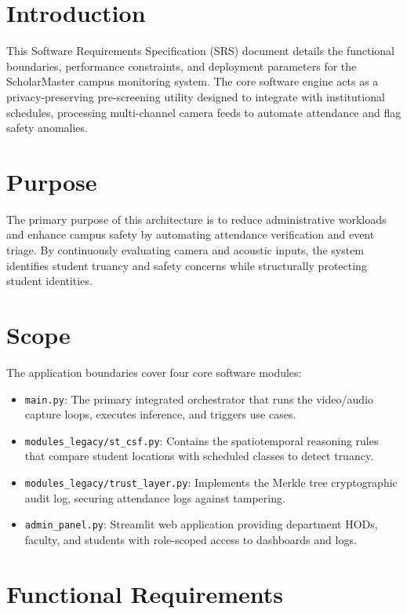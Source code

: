 \documentclass[12pt,a4paper,oneside]{report}
\begin{document}
\section{Introduction}
This Software Requirements Specification (SRS) document details the functional boundaries, performance constraints, and deployment parameters for the ScholarMaster campus monitoring system. The core software engine acts as a privacy-preserving pre-screening utility designed to integrate with institutional schedules, processing multi-channel camera feeds to automate attendance and flag safety anomalies.

\section{Purpose}
The primary purpose of this architecture is to reduce administrative workloads and enhance campus safety by automating attendance verification and event triage. By continuously evaluating camera and acoustic inputs, the system identifies student truancy and safety concerns while structurally protecting student identities.

\section{Scope}
The application boundaries cover four core software modules:
\begin{itemize}
    \item \texttt{main.py}: The primary integrated orchestrator that runs the video/audio capture loops, executes inference, and triggers use cases.
    \item \texttt{modules\_legacy/st\_csf.py}: Contains the spatiotemporal reasoning rules that compare student locations with scheduled classes to detect truancy.
    \item \texttt{modules\_legacy/trust\_layer.py}: Implements the Merkle tree cryptographic audit log, securing attendance logs against tampering.
    \item \texttt{admin\_panel.py}: Streamlit web application providing department HODs, faculty, and students with role-scoped access to dashboards and logs.
\end{itemize}

\section{Functional Requirements}
\end{document}

